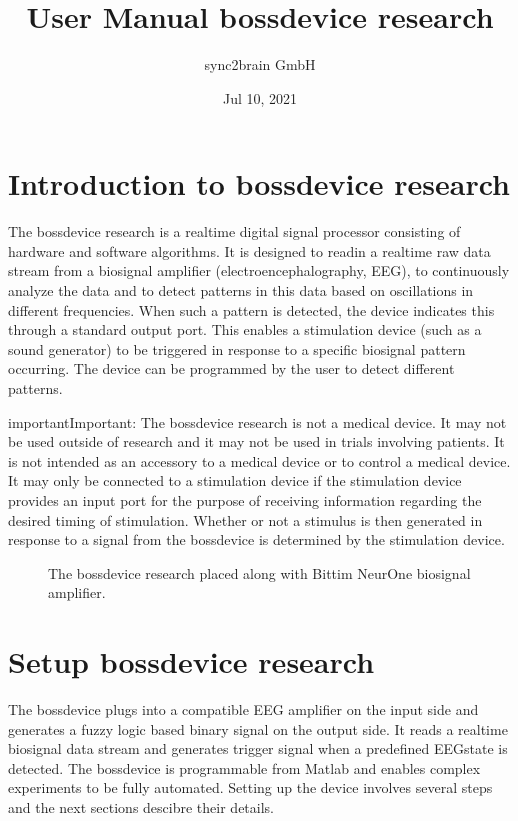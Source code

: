\documentclass[letterpaper,10pt,english]{sphinxmanual}
\title{User Manual \sphinxhyphen{} bossdevice research}
\date{Jul 10, 2021}
\author{sync2brain GmbH}
\begin{document}
\pagestyle{empty}
\sphinxmaketitle
\pagestyle{plain}
\sphinxtableofcontents
\pagestyle{normal}
\label{\detokenize{index::doc}}



\chapter{Introduction to bossdevice research}
\label{\detokenize{1_introduction_to_bossdevice_research:introduction-to-bossdevice-research}}\label{\detokenize{1_introduction_to_bossdevice_research::doc}}
The bossdevice research is a real\sphinxhyphen{}time digital signal processor consisting of hardware and software algorithms. It is designed to read\sphinxhyphen{}in a real\sphinxhyphen{}time raw data stream from a biosignal amplifier (electroencephalography, EEG), to continuously analyze the data and to detect patterns in this data based on oscillations in different frequencies. When such a pattern is detected, the device indicates this through a standard output port. This enables a stimulation device (such as a sound generator) to be triggered in response to a specific biosignal pattern occurring. The device can be programmed by the user to detect different patterns.

\begin{sphinxadmonition}{important}{Important:}
The bossdevice research is not a medical device. It may not be used outside of research and it may not be used in trials involving patients. It is not intended as an accessory to a medical device or to control a medical device. It may only be connected to a stimulation device if the stimulation device provides an input port for the purpose of receiving information regarding the desired timing of stimulation. Whether or not a stimulus is then generated in response to a signal from the bossdevice is determined by the stimulation device.
\end{sphinxadmonition}

\begin{figure}[htbp]
\centering
\capstart

\noindent{}
\caption{The bossdevice research placed along with Bittim NeurOne biosignal amplifier.}\label{\detokenize{1_introduction_to_bossdevice_research:id1}}\end{figure}


\chapter{Setup bossdevice research}
\label{\detokenize{2_setup_bossdevice_research:setup-bossdevice-research}}\label{\detokenize{2_setup_bossdevice_research::doc}}
The bossdevice plugs into a compatible EEG amplifier on the input side and generates a fuzzy logic based binary signal on the output side. It reads a real\sphinxhyphen{}time biosignal data stream and generates trigger signal when a pre\sphinxhyphen{}defined EEG\sphinxhyphen{}state is detected. The bossdevice is programmable from Matlab and enables complex experiments to be fully automated. Setting up the device involves several steps and the next sections descibre their details.
\end{document}
